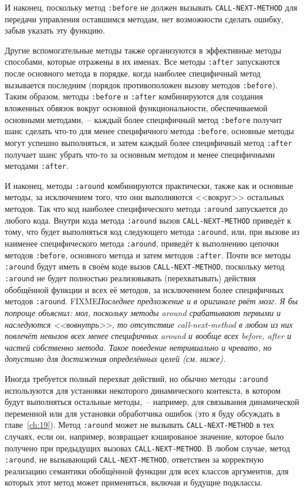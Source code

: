 И наконец, поскольку метод \lstinline{:before} не должен вызывать \lstinline{CALL-NEXT-METHOD} для
передачи управления оставшимся методам, нет возможности сделать ошибку, забыв указать эту
функцию.

Другие вспомогательные методы также организуются в эффективные методы способами, которые
отражены в их именах.  Все методы \lstinline{:after} запускаются после основного метода в
порядке, когда наиболее специфичный метод вызывается последним (порядок противоположен
вызову методов \lstinline{:before}).  Таким образом, методы \lstinline{:before} и \lstinline{:after}
комбинируются для создания вложенных обвязок вокруг основной функциональности,
обеспечиваемой основными методами,~-- каждый более специфичный метод \lstinline{:before} получит
шанс сделать что-то для менее специфичного метода \lstinline{:before}, основные методы могут
успешно выполняться, и затем каждый более специфичный метод \lstinline{:after} получает шанс
убрать что-то за основным методом и менее специфичными методами \lstinline{:after}.

И наконец, методы \lstinline{:around} комбинируются практически, также как и основные методы, за
исключением того, что они выполняются <<вокруг>> остальных методов. Так что код наиболее
специфического метода \lstinline{:around} запускается до любого кода. Внутри кода метода
\lstinline{:around} вызов \lstinline{CALL-NEXT-METHOD} приведёт к тому, что будет выполняться код
следующего метода \lstinline{:around}, или, при вызове из наименее специфического метода
\lstinline{:around}, приведёт к выполнению цепочки методов \lstinline{:before}, основного метода и
затем методов \lstinline{:after}.  Почти все методы \lstinline{:around} будут иметь в своём коде
вызов \lstinline{CALL-NEXT-METHOD}, поскольку метод \lstinline{:around} не будет полностью
реализовывать (перехватывать) действия обобщённой функции и всех её методов, за
исключением более специфичных методов \lstinline{:around}. FIXME\textit{Последнее предложение и
  в оригинале рвёт мозг. Я бы попроще объяснил: мол, поскольку методы around срабатывают
  первыми и наследуются <<вовнутрь>>, то отсутствие call-next-method в любом из них повлечёт
  невызов всех менее специфичных around и вообще всех before, after и частей собственно
  метода. Такое поведение нетривиально и чревато, но допустимо для достижения определённых
  целей (см. ниже).}

Иногда требуется полный перехват действий, но обычно методы \lstinline{:around} используются
для установки некоторого динамического контекста, в котором будут выполняться остальные
методы,~-- например, для связывания динамической переменной или для установки обработчика
ошибок (это я буду обсуждать в главе~\ref{ch:19}).  Метод \lstinline{:around} может не вызывать
\lstinline{CALL-NEXT-METHOD} в тех случаях, если он, например, возвращает кэшированое значение,
которое было получено при предыдущих вызовах \lstinline{CALL-NEXT-METHOD}.  В любом случае,
метод \lstinline{:around}, не вызывающий \lstinline{CALL-NEXT-METHOD}, ответствен за корректную
реализацию семантики обобщённой функции для всех классов аргументов, для которых этот
метод может применяться, включая и будущие подклассы.

